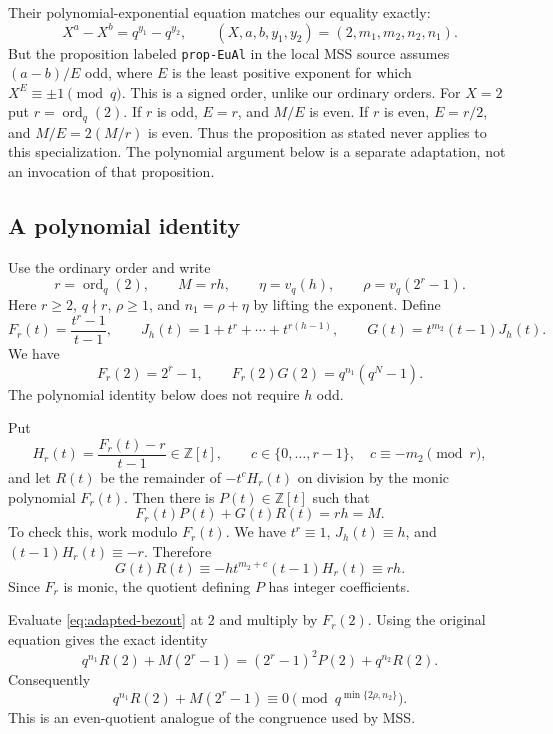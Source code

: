 \documentclass[11pt]{article}
\begin{document}
Their polynomial-exponential equation matches our equality exactly:
\[
X^a-X^b=q^{y_1}-q^{y_2},\qquad
(X,a,b,y_1,y_2)=(2,m_1,m_2,n_2,n_1).
\]
But the proposition labeled \texttt{prop-EuAl} in the local MSS source
assumes $(a-b)/E$ odd, where $E$ is the least positive exponent for which
$X^E\equiv\pm1\pmod q$. This is a signed order, unlike our ordinary orders.
For $X=2$ put $r=\operatorname{ord}_q(2)$. If $r$ is odd, $E=r$,
and $M/E$ is even. If $r$ is even, $E=r/2$, and $M/E=2(M/r)$ is even.
Thus the proposition as stated never applies to this specialization.
The polynomial argument below is a separate adaptation, not an invocation
of that proposition.

\subsection{A polynomial identity}
\label{sec:polynomial}

Use the ordinary order and write
\[
r=\operatorname{ord}_q(2),\qquad M=rh,\qquad
\eta=v_q(h),\qquad \rho=v_q(2^r-1).
\]
Here $r\geq2$, $q\nmid r$, $\rho\geq1$, and
$n_1=\rho+\eta$ by lifting the exponent.
Define
\[
F_r(t)=\frac{t^r-1}{t-1},\qquad
J_h(t)=1+t^r+\cdots+t^{r(h-1)},\qquad
G(t)=t^{m_2}(t-1)J_h(t).
\]
We have
\[
F_r(2)=2^r-1,\qquad
F_r(2)G(2)=q^{n_1}(q^N-1).
\]
The polynomial identity below does not require $h$ odd.

Put
\[
H_r(t)=\frac{F_r(t)-r}{t-1}\in\mathbb Z[t],
\qquad c\in\{0,\ldots,r-1\},\quad c\equiv-m_2\pmod r,
\]
and let $R(t)$ be the remainder of $-t^cH_r(t)$ on division by the
monic polynomial $F_r(t)$. Then there is $P(t)\in\mathbb Z[t]$ such that
\begin{equation}\label{eq:adapted-bezout}
\boxed{F_r(t)P(t)+G(t)R(t)=rh=M.}
\end{equation}
To check this, work modulo $F_r(t)$. We have $t^r\equiv1$,
$J_h(t)\equiv h$, and $(t-1)H_r(t)\equiv-r$. Therefore
\[
G(t)R(t)\equiv
-h t^{m_2+c}(t-1)H_r(t)\equiv rh.
\]
Since $F_r$ is monic, the quotient defining $P$ has integer coefficients.

Evaluate \eqref{eq:adapted-bezout} at $2$ and multiply by $F_r(2)$.
Using the original equation gives the exact identity
\[
q^{n_1}R(2)+M(2^r-1)
=(2^r-1)^2P(2)+q^{n_2}R(2).
\]
Consequently
\begin{equation}\label{eq:adapted-congruence}
\boxed{
q^{n_1}R(2)+M(2^r-1)
\equiv0\pmod{q^{\min\{2\rho,n_2\}}}.}
\end{equation}
This is an even-quotient analogue of the congruence used by MSS.
\end{document}
